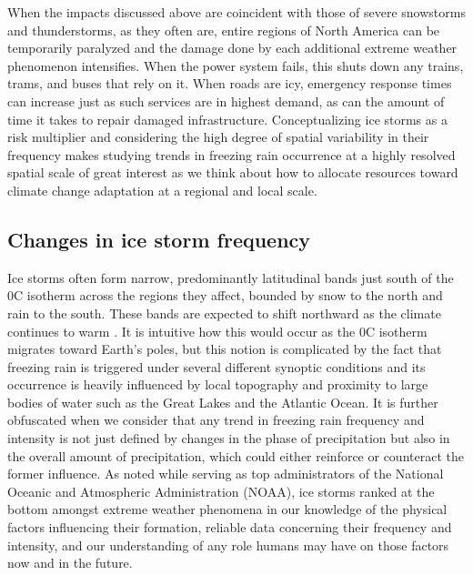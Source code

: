 \documentclass[twocol]{ametsoc}
\begin{document}
When the impacts discussed above are coincident with those of severe snowstorms and thunderstorms, as they often are, entire regions of North America can be temporarily paralyzed and the damage done by each additional extreme weather phenomenon intensifies. When the power system fails, this shuts down any trains, trams, and buses that rely on it. When roads are icy, emergency response times can increase just as such services are in highest demand, as can the amount of time it takes to repair damaged infrastructure. Conceptualizing ice storms as a risk multiplier and considering the high degree of spatial variability in their frequency makes studying trends in freezing rain occurrence at a highly resolved spatial scale of great interest as we think about how to allocate resources toward climate change adaptation at a regional and local scale.

\subsection{Changes in ice storm frequency}
Ice storms often form narrow, predominantly latitudinal bands just south of the 0\degree C isotherm across the regions they affect, bounded by snow to the north and rain to the south. These bands are expected to shift northward as the climate continues to warm \citep{cheng2011possible,lambert2011simulated}. It is intuitive how this would occur as the 0\degree C isotherm migrates toward Earth's poles, but this notion is complicated by the fact that freezing rain is triggered under several different synoptic conditions and its occurrence is heavily influenced by local topography and proximity to large bodies of water such as the Great Lakes and the Atlantic Ocean. It is further obfuscated when we consider that any trend in freezing rain frequency and intensity is not just defined by changes in the phase of precipitation but also in the overall amount of precipitation, which could either reinforce or counteract the former influence. As \citet{lubchenco2012extreme} noted while serving as top administrators of the National Oceanic and Atmospheric Administration (NOAA), ice storms ranked at the bottom amongst extreme weather phenomena in our knowledge of the physical factors influencing their formation, reliable data concerning their frequency and intensity, and our understanding of any role humans may have on those factors now and in the future.
\end{document}
